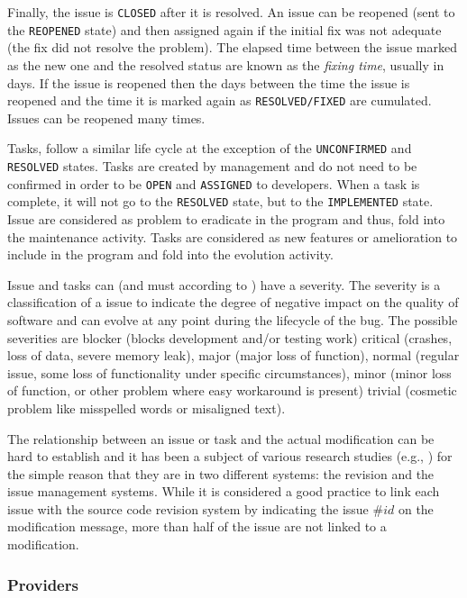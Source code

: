 Finally, the issue is {\tt CLOSED} after it is resolved.
An issue can be reopened (sent to the {\tt REOPENED} state) and then assigned again if the initial fix was not adequate (the fix did not resolve the problem). The elapsed time between the issue marked as the new one and the resolved status are known as the {\it fixing time}, usually in days.
If the issue is reopened then the days between the time the issue is reopened and the time it is marked again as {\tt RESOLVED/FIXED} are cumulated. Issues can be reopened many times.

Tasks, follow a similar life cycle at the exception of the {\tt UNCONFIRMED} and {\tt RESOLVED} states.
Tasks are created by management and do not need to be confirmed in order to be {\tt OPEN} and {\tt ASSIGNED} to developers.
When a task is complete, it will not go to the {\tt RESOLVED} state, but to the {\tt IMPLEMENTED} state.
Issue are considered as problem to eradicate in the program and thus, fold into the maintenance activity.
Tasks are considered as new features or amelioration to include in the program and fold into the evolution activity.

Issue and tasks can (and must according to \cite{Bettenburg2008}) have a
severity. The severity is a classification of a issue to indicate the
degree of negative impact on the quality of software and can
evolve at any point during the lifecycle of the bug. The possible severities are blocker (blocks
development and/or testing work) critical (crashes, loss of
data, severe memory leak), major (major loss of function),
normal (regular issue, some loss of functionality under
specific circumstances), minor (minor loss of function, or
other problem where easy workaround is present) trivial
(cosmetic problem like misspelled words or misaligned text).


The relationship between an issue or task and the actual modification can be hard to establish and it has been a subject of various research studies (e.g., \cite{Antoniol2002,Bachmann2010,Wu2011}) for the simple reason that they are in two different systems: the revision and the issue management systems. While it is considered a good practice to link each issue with the source code revision system by indicating the issue $\#id$ on the modification message, more than half of the issue are not linked to a modification.


\subsubsection{Providers\label{sec:bug-provider}}

